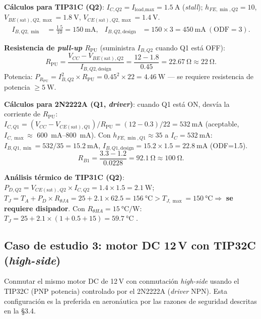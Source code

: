 \documentclass[11pt]{article}
\begin{document}
\textbf{Cálculos para TIP31C (Q2)}: $I_{C,Q2}=I_\text{load,max}=\SI{1.5}{\ampere}$
(\emph{stall}); $h_{FE,\min,Q2}=10$, $V_{BE(\text{sat}),Q2,\max}=\SI{1.8}{\volt}$,
$V_{CE(\text{sat}),Q2,\max}=\SI{1.4}{\volt}$.
\begin{align}
  I_{B,Q2,\min} &= \frac{1.5}{10} = \SI{150}{\milli\ampere}, &
  I_{B,Q2,\text{design}} &= 150\times 3 = \SI{450}{\milli\ampere}\ (\text{ODF}=3).
\end{align}

\textbf{Resistencia de \emph{pull-up} $R_\text{PU}$} (suministra $I_{B,Q2}$ cuando Q1 está
OFF):
\begin{equation}
  R_\text{PU} = \frac{V_{CC}-V_{BE(\text{sat}),Q2}}{I_{B,Q2,\text{design}}}
              = \frac{12-1.8}{0.45} = \SI{22.67}{\ohm}\approx\SI{22}{\ohm}.
\end{equation}
Potencia: $P_{R_\text{PU}} = I_{B,Q2}^2\times R_\text{PU} = 0.45^2\times 22 = \SI{4.46}{\watt}$
— se requiere resistencia de potencia $\ge\SI{5}{\watt}$.

\textbf{Cálculos para 2N2222A (Q1, \emph{driver})}: cuando Q1 está ON, desvía la
corriente de $R_\text{PU}$: $I_{C,Q1} = (V_{CC}-V_{CE(\text{sat}),Q1})/R_\text{PU} =
(12-0.3)/22 = \SI{532}{\milli\ampere}$ (aceptable, $I_{C,\max}\approx$
\SIrange{600}{800}{\milli\ampere}). Con $h_{FE,\min,Q1}\approx 35$ a
$I_C=\SI{532}{\milli\ampere}$: $I_{B,Q1,\min}=532/35=\SI{15.2}{\milli\ampere}$,
$I_{B,Q1,\text{design}}=15.2\times 1.5=\SI{22.8}{\milli\ampere}$ (ODF=1.5).
\begin{equation}
  R_{B1} = \frac{3.3-1.2}{0.0228} = \SI{92.1}{\ohm}\approx\SI{100}{\ohm}.
\end{equation}

\textbf{Análisis térmico de TIP31C (Q2)}:
$P_{D,Q2}=V_{CE(\text{sat}),Q2}\times I_{C,Q2}=1.4\times 1.5=\SI{2.1}{\watt}$;
$T_J=T_A+P_D\times R_{\theta JA}=25+2.1\times 62.5=\SI{156}{\celsius} >
T_{J,\max}=\SI{150}{\celsius} \Rightarrow$ \textbf{se requiere disipador}. Con
$R_{\theta HA}=\SI{15}{\celsius\per\watt}$:
$T_J=25+2.1\times(1+0.5+15)=\SI{59.7}{\celsius}$ \checkmark.

\subsection{Caso de estudio 3: motor DC 12\,V con TIP32C (\emph{high-side})}
Conmutar el mismo motor DC de 12\,V con conmutación \emph{high-side} usando el TIP32C
(PNP potencia) controlado por el 2N2222A (\emph{driver} NPN). Esta configuración es la
preferida en aeronáutica por las razones de seguridad descritas en la \S3.4.
\end{document}
